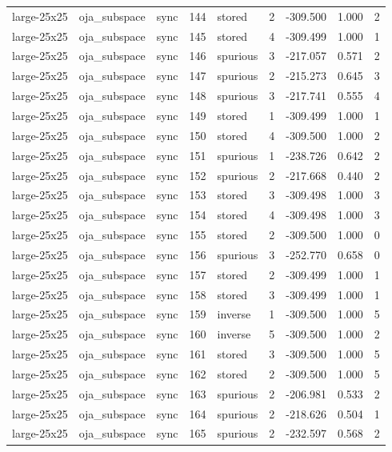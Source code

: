 \begin{tabular}{lllrlrrrr}
large-25x25 & oja\_subspace & sync & 144 & stored & 2 & -309.500 & 1.000 & 2 \\
large-25x25 & oja\_subspace & sync & 145 & stored & 4 & -309.499 & 1.000 & 1 \\
large-25x25 & oja\_subspace & sync & 146 & spurious & 3 & -217.057 & 0.571 & 2 \\
large-25x25 & oja\_subspace & sync & 147 & spurious & 2 & -215.273 & 0.645 & 3 \\
large-25x25 & oja\_subspace & sync & 148 & spurious & 3 & -217.741 & 0.555 & 4 \\
large-25x25 & oja\_subspace & sync & 149 & stored & 1 & -309.499 & 1.000 & 1 \\
large-25x25 & oja\_subspace & sync & 150 & stored & 4 & -309.500 & 1.000 & 2 \\
large-25x25 & oja\_subspace & sync & 151 & spurious & 1 & -238.726 & 0.642 & 2 \\
large-25x25 & oja\_subspace & sync & 152 & spurious & 2 & -217.668 & 0.440 & 2 \\
large-25x25 & oja\_subspace & sync & 153 & stored & 3 & -309.498 & 1.000 & 3 \\
large-25x25 & oja\_subspace & sync & 154 & stored & 4 & -309.498 & 1.000 & 3 \\
large-25x25 & oja\_subspace & sync & 155 & stored & 2 & -309.500 & 1.000 & 0 \\
large-25x25 & oja\_subspace & sync & 156 & spurious & 3 & -252.770 & 0.658 & 0 \\
large-25x25 & oja\_subspace & sync & 157 & stored & 2 & -309.499 & 1.000 & 1 \\
large-25x25 & oja\_subspace & sync & 158 & stored & 3 & -309.499 & 1.000 & 1 \\
large-25x25 & oja\_subspace & sync & 159 & inverse & 1 & -309.500 & 1.000 & 5 \\
large-25x25 & oja\_subspace & sync & 160 & inverse & 5 & -309.500 & 1.000 & 2 \\
large-25x25 & oja\_subspace & sync & 161 & stored & 3 & -309.500 & 1.000 & 5 \\
large-25x25 & oja\_subspace & sync & 162 & stored & 2 & -309.500 & 1.000 & 5 \\
large-25x25 & oja\_subspace & sync & 163 & spurious & 2 & -206.981 & 0.533 & 2 \\
large-25x25 & oja\_subspace & sync & 164 & spurious & 2 & -218.626 & 0.504 & 1 \\
large-25x25 & oja\_subspace & sync & 165 & spurious & 2 & -232.597 & 0.568 & 2 \\

\end{tabular}

